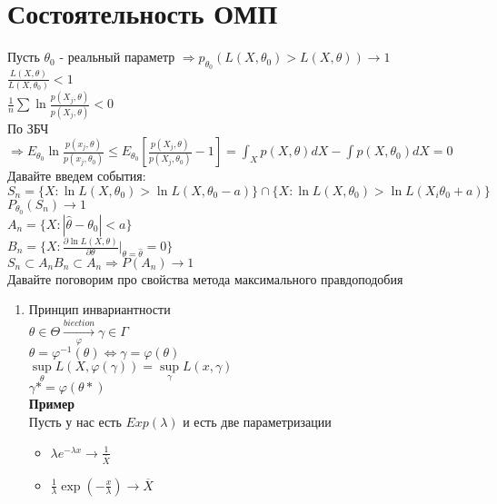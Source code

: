 \documentclass{article}
\newcommand\0{\mathbb{0}}
\newcommand\1{\mathbb{1}}
\newcommand{\xrto}{\xrightarrow}
\newcommand{\LRto}{\Leftrightarrow}
\begin{document}
\section{Состоятельность ОМП}
Пусть $\theta_0$ - реальный параметр $\Rightarrow p_{\theta_0}(L(X, \theta_0) > L(X, \theta)) \to 1$\\
$\frac{L(X, \theta)}{L(X, \theta_0)} < 1$\\
$\frac{1}{n}\displaystyle\sum \ln{\frac{p(X_j, \theta)}{p(X_j, \theta)}} < 0$\\
По ЗБЧ $\Rightarrow E_{\theta_0} \ln{\frac{p(x_j, \theta)}{p(x_j, \theta_0)}} \leq E_{\theta_0} [\frac{p(X_j, \theta)}{p(X_j, \theta_0)} - 1] = \displaystyle\int_X p(X, \theta)dX - \displaystyle\int p(X, \theta_0)dX = 0$\\
Давайте введем события:\\
$S_n = \{X : \ln{L(X, \theta_0)} > \ln{L(X, \theta_0 - a)}\} \cap \{X : \ln{L(X, \theta_0)} > \ln{L(X_i \theta_0 + a)}\}$\\
$P_{\theta_0}(S_n) \to 1$\\
$A_n = \{X : |\widehat{\theta} - \theta_0| < a\}$\\
$B_n = \{X : \frac{\partial \ln{L(X, \theta)}}{\partial \theta} |_{\theta = \widehat{\theta}} = 0\}$\\
$S_n \subset A_n B_n \subset A_n \Rightarrow P(A_n) \to 1$\\
Давайте поговорим про свойства метода максимального правдоподобия\\
\begin{enumerate}
    \item Принцип инвариантности\\
    $\theta \in \Theta \xrto[\varphi]{biection} \gamma \in \Gamma$\\
    $\theta = \varphi^{-1}(\theta) \LRto \gamma = \varphi(\theta)$\\
    $\underset{\theta}{\sup}L(X, \varphi(\gamma)) = \underset{\gamma}{\sup}L(x, \gamma)$\\
    $\gamma* = \varphi(\theta*)$\\
    \textbf{Пример}\\
    Пусть у нас есть $Exp(\lambda)$ и есть две параметризации\\
    \begin{itemize}
        \item $\lambda e^{-\lambda x} \to \frac{1}{\overline{X}}$
        \item $\frac{1}{\lambda} \exp(-\frac{x}{\lambda}) \to \overline{X}$
    \end{itemize}
\end{enumerate}
\end{document}
